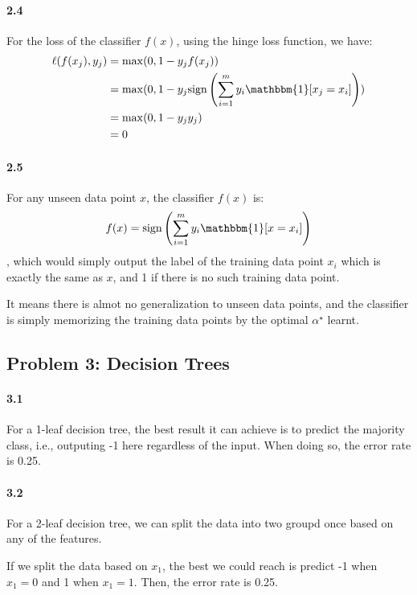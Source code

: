 \documentclass[11pt]{article}
\begin{document}
\paragraph{2.4}

For the loss of the classifier $f(x)$, using the hinge loss function, we have:
\begin{equation}
    \begin{split}
        \ell(f(x_j), y_j) &= \max(0, 1-y_jf(x_j)) \\
        &= \max(0, 1-y_j \text{sign} \left( \sum_{i=1}^m y_i \mathbbm{1}[x_j=x_i]  \right)) \\ 
        &= \max(0, 1-y_j y_j) \\
        &= 0
    \end{split}
\end{equation}
\paragraph{2.5}
For any unseen data point $x$, the classifier $f(x)$ is:
\begin{equation}
    f(x) = \text{sign} \left( \sum_{i=1}^m y_i \mathbbm{1}[x=x_i] \right)
\end{equation}
, which would simply output the label of the training data point $x_i$ which is exactly the same as $x$, and 1 if there is no such training data point.

It means there is almot no generalization to unseen data points, and the classifier is simply memorizing the training data points by the optimal $\alpha^\star$ learnt.
\subsection*{\Large Problem 3: Decision Trees}
\paragraph{3.1}
For a 1-leaf decision tree, the best result it can achieve is to predict the majority class, i.e., outputing -1 here regardless of the input. When doing so, the error rate is 0.25.
\paragraph{3.2}
For a 2-leaf decision tree, we can split the data into two groupd once based on any of the features. 

If we split the data based on $x_1$, the best we could reach is predict -1 when $x_1=0$ and 1 when $x_1=1$. Then, the error rate is 0.25.
\end{document}
